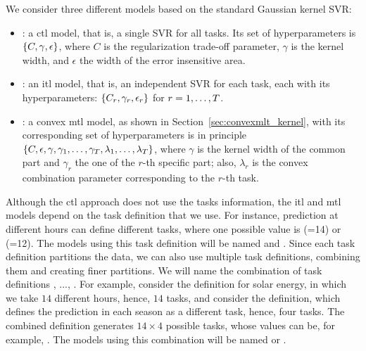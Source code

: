 %
We consider three different models based on the standard Gaussian kernel SVR:
\begin{itemize}
    \item {}: a \acrshort{ctl} model, that is, a single SVR for all tasks. Its set of hyperparameters is $\left\{C, \gamma, \epsilon\right\}$, where $C$ is the regularization trade-off parameter, $\gamma$ is the kernel width, and $\epsilon$ the width of the error insensitive area.
    \item {}: an \acrshort{itl} model, that is, an independent SVR for each task, each with its hyperparameters: $\left\{C_r, \gamma_r, \epsilon_r\right\}$ for $r=1, \ldots, T$.
    \item {}: a convex \acrshort{mtl} model, as shown in Section~\ref{sec:convexmlt_kernel}, with its corresponding set of hyperparameters is in principle $\left\{C, \epsilon, \gamma, \gamma_1, \ldots, \gamma_T, \lambda_1, \ldots, \lambda_T\right\}$, where $\gamma$ is the kernel width of the common part and $\gamma_r$ the one of the $r$-th specific part; also, $\lambda_r$ is the convex combination parameter corresponding to the $r$-th task.
\end{itemize}
%
Although the \acrshort{ctl} approach does not use the tasks information, the \acrshort{itl} and \acrshort{mtl} models depend on the task definition that we use. For instance, prediction at different hours can define different tasks, where one possible value is (=14) or (=12). The models using this task definition will be named  and . 
%
Since each task definition partitions the data, we can also use multiple task definitions, combining them and creating finer partitions. 
We will name  the combination of task definitions , ..., . For example, consider the  definition for solar energy, in which we take $14$ different hours, hence, $14$ tasks, and consider the  definition, which defines the prediction in each season as a different task, hence, four tasks. The combined definition  generates $14 \times 4$ possible tasks, whose values can be, for example, .
The models using this combination will be named  or .

